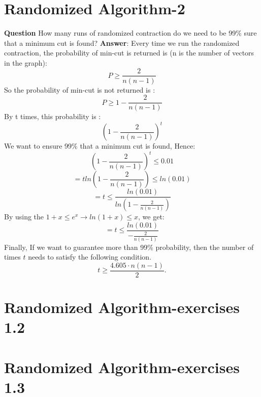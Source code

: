 \documentclass[12pt]{article}
\begin{document}
\section{Randomized Algorithm-2}
\textbf{Question}
How many runs of randomized contraction do we need to be 99\% sure that a minimum cut is found?
\textbf{Answer}:
Every time we run the randomized contraction, the probability of min-cut is returned is (n is the number of vectors in the graph):
\[P\geq\frac{2}{n(n-1)}\]
So the probability of min-cut is not returned is :
\[P\geq1-\frac{2}{n(n-1)}\]
By t times, this probability is :
\[(1-\frac{2}{n(n-1)})^t\]
We want to ensure 99\% that a minimum cut is found, Hence:
\[(1-\frac{2}{n(n-1)})^t\leq0.01\]
\[=tln(1-\frac{2}{n(n-1)})\leq ln(0.01)\]
\[=t\leq \frac{ln(0.01)}{ln(1-\frac{2}{n(n-1)})}\]
By using the \(1+x\leq e^x \rightarrow ln(1+x)\leq x\), we get:
\[=t\leq \frac{ln(0.01)}{-\frac{2}{n(n-1)}}\]
Finally, If we want to guarantee more than 99\% probability, then the number of times \(t\) needs to satisfy the following condition.
\[
t \geq \frac{4.605 \cdot n(n - 1)}{2}.
\]


\section{Randomized Algorithm-exercises 1.2}

\section{Randomized Algorithm-exercises 1.3}
\end{document}
